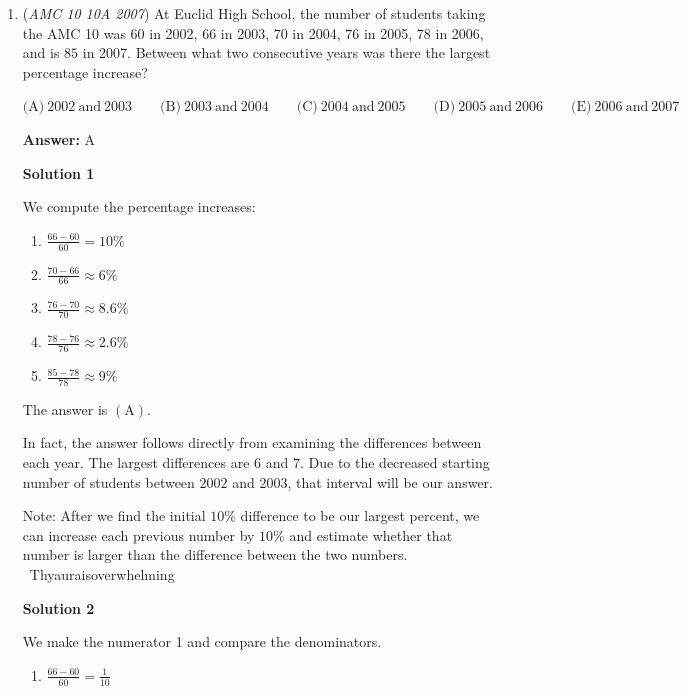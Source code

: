 \begin{enumerate}
 Note: 6.00 dollars would imply that 1 pencil and 1 notebook would cost more than 30\% of 5 pencils and 3 notebooks, which is incorrect. 

 


	\item (\textit{AMC 10 10A 2007}) At Euclid High School, the number of students taking the AMC 10 was $60$ in 2002, $66$ in 2003, $70$ in 2004, $76$ in 2005, $78$ in 2006, and is $85$ in 2007. Between what two consecutive years was there the largest percentage increase?


 $\text{(A)}\ 2002\ \text{and}\ 2003 \qquad \text{(B)}\ 2003\ \text{and}\ 2004 \qquad \text{(C)}\ 2004\ \text{and}\ 2005 \qquad \text{(D)}\ 2005\ \text{and}\ 2006 \qquad \text{(E)}\ 2006\ \text{and}\ 2007$

 \textbf{Answer: }A



\textbf{Solution 1}

We compute the percentage increases:

 
            \begin{enumerate}
        \item $\frac{66 - 60}{60} = 10\%$
        \item $\frac{70 - 66}{66} \approx 6\%$
        \item $\frac{76-70}{70} \approx 8.6\%$
        \item $\frac{78-76}{76} \approx 2.6\%$
        \item $\frac{85-78}{78} \approx 9\%$
            \end{enumerate}
            The answer is $\mathrm{(A)}$. 

 In fact, the answer follows directly from examining the differences between each year. The largest differences are $6$ and $7$. Due to the decreased starting number of students between $2002$ and $2003$, that interval will be our answer.

 Note: After we find the initial $10$\% difference to be our largest percent, we can increase each previous number by $10$\% and estimate whether that number is larger than the difference between the two numbers. ~Thyauraisoverwhelming

 



\textbf{Solution 2}

We make the numerator 1 and compare the denominators.

 
            \begin{enumerate}
        \item $\frac{66 - 60}{60} = \frac{1}{10}$
            \end{enumerate}
            

\end{enumerate}
